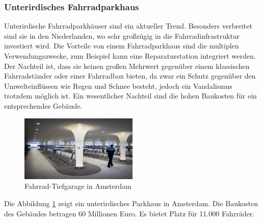 \subsubsection{Unterirdisches Fahrradparkhaus}
Unterirdische Fahrradparkhäuser sind ein aktueller Trend. Besonders verbreitet sind sie in den Niederlanden, wo sehr großzügig in die Fahrradinfrastruktur investiert wird. Die Vorteile von einem Fahrradparkhaus sind die multiplen Verwendungszwecke, zum Beispiel kann eine Reparaturstation integriert werden.\\
Der Nachteil ist, dass sie keinen großen Mehrwert gegenüber einem klassischen Fahrradständer oder einer Fahrradbox bieten, da zwar ein Schutz gegenüber den Umwelteinflüssen wie Regen und Schnee besteht, jedoch ein Vandalismus trotzdem möglich ist. Ein wesentlicher Nachteil sind die hohen Baukosten für ein entsprechendes Gebäude.\\

\begin{figure}[H]
    \centering
    \includegraphics[width=0.5\textwidth]{images/unterirdischesfahrradparkhaus.jpg}
    \caption{Fahrrad-Tiefgarage in Amsterdam \cite{fahradtiefgarage}}
    \label{fig:fahradtiefgarage}
\end{figure}

Die Abbildung \ref*{fig:fahradtiefgarage} zeigt ein unterirdisches Parkhaus in Amsterdam. Die Baukosten des Gebäudes betragen 60 Millionen Euro. Es bietet Platz für 11.000 Fahrräder.
